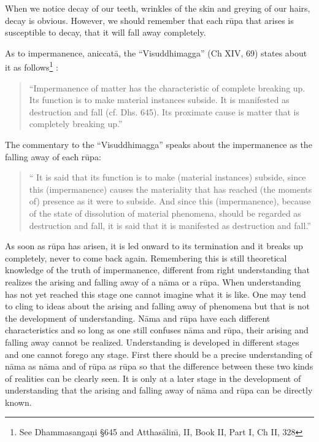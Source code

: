 \documentclass{book}
\begin{document}
When we notice decay of our teeth, wrinkles of the skin and greying of
our hairs, decay is obvious. However, we should remember that each
r\=upa that arises is susceptible to decay, that it will fall away
completely. 




As to impermanence, aniccat{\=a}, the ``Visuddhimagga'' (Ch XIV, 69)
states about it as follows\footnote{See Dhamma\-sanga\d ni {\S}645 and
Atthas{\=a}lin\=\i, II, Book II, Part I, Ch II, 328} : 

\begin{quote}\begin{flushleft}
``Impermanence of matter has the
characteristic of complete
breaking up. Its function is to make material instances subside. It is
manifested as destruction and fall (cf. Dhs. 645). Its proximate cause
is matter that is completely breaking up.''
\end{flushleft}\end{quote}




The commentary to the ``Visuddhimagga'' speaks about the impermanence as
the falling away of each r\=upa: 




\begin{quote}\begin{flushleft}
`` It is said that its function is to make (material instances) subside,
since this (impermanence) causes the materiality that has reached (the
moments of) presence as it were to subside. And since this
(impermanence), because of the state of dissolution of material
phenomena, should be regarded as destruction and fall, it is said that
it is manifested as destruction and fall.''
\end{flushleft}\end{quote}




As soon as r\=upa has arisen, it is led onward to its termination and it
breaks up completely, never to come back again. Remembering this is
still theoretical knowledge of the truth of impermanence, different
from right understanding that realizes the arising and falling away of
a n{\=a}ma or a r\=upa. When understanding has not yet reached this
stage one cannot imagine what it is like. One may tend to cling to
ideas about the arising and falling away of phenomena but that is not
the development of understanding. N{\=a}ma and r\=upa have each
different characteristics and so long as one still confuses n{\=a}ma
and r\=upa, their arising and falling away cannot be realized.
Understanding is developed in different stages and one cannot forego
any stage. First there should be a precise understanding of n{\=a}ma as
n{\=a}ma and of r\=upa as r\=upa so that the difference between these
two kinds of realities can be clearly seen. It is only at a later stage
in the development of understanding that the arising and falling away
of n{\=a}ma and r\=upa can be directly known. 
\end{document}
